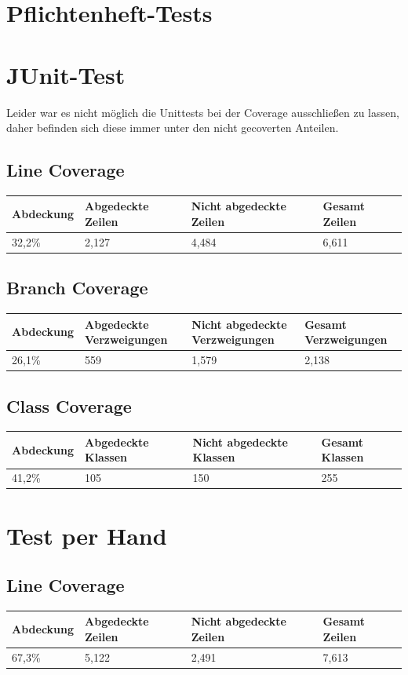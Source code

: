 \documentclass[10pt]{scrreprt}
\begin{document}
\section{Pflichtenheft-Tests}
\section{JUnit-Test}
Leider war es nicht möglich die Unittests bei der Coverage ausschließen zu lassen, daher befinden sich diese immer unter den nicht gecoverten Anteilen.
\subsection{Line Coverage}
\begin{longtable}{|l|p{}|p{}|p{}|}
\hline
Abdeckung & Abgedeckte Zeilen & Nicht abgedeckte Zeilen & Gesamt Zeilen \\
\hline
\hline
32,2\% & 2,127 & 4,484 & 6,611 \\
\hline
\end{longtable}
\subsection{Branch Coverage}
\begin{longtable}{|l|p{}|p{}|p{}|}
\hline
Abdeckung & Abgedeckte Verzweigungen & Nicht abgedeckte Verzweigungen & Gesamt Verzweigungen \\
\hline
\hline
26,1\% & 559 & 1,579 & 2,138 \\
\hline
\end{longtable}
\subsection{Class Coverage}
\begin{longtable}{|l|p{}|p{}|p{}|}
\hline
Abdeckung & Abgedeckte Klassen & Nicht abgedeckte Klassen & Gesamt Klassen \\
\hline
\hline
41,2\% & 105 & 150 & 255 \\
\hline
\end{longtable}
\section{Test per Hand}
\subsection{Line Coverage}
\begin{longtable}{|l|p{}|p{}|p{}|}
\hline
Abdeckung & Abgedeckte Zeilen & Nicht abgedeckte Zeilen & Gesamt Zeilen \\
\hline
\hline
67,3\% & 5,122 & 2,491 & 7,613 \\
\hline
\end{longtable}
\end{document}
